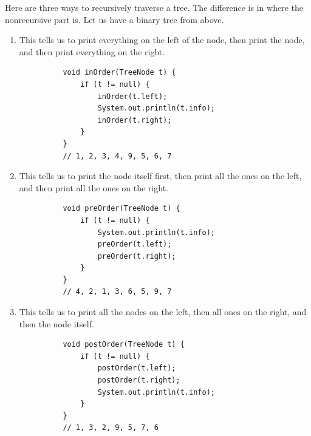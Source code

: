 \documentclass{article}
\begin{document}
      \begin{theorem}
      Here are three ways to recursively traverse a tree. The difference is in where the nonrecursive part is. Let us have a binary tree from above. 
      \begin{enumerate}
          \item This tells us to print everything on the left of the node, then print the node, and then print everything on the right. 
          \begin{lstlisting}
          void inOrder(TreeNode t) {
              if (t != null) {
                  inOrder(t.left);
                  System.out.println(t.info); 
                  inOrder(t.right); 
              }
          }
          // 1, 2, 3, 4, 9, 5, 6, 7
          \end{lstlisting}
          
          \item This tells us to print the node itself first, then print all the ones on the left, and then print all the ones on the right. 
          \begin{lstlisting}
          void preOrder(TreeNode t) {
              if (t != null) {
                  System.out.println(t.info); 
                  preOrder(t.left); 
                  preOrder(t.right); 
              }
          }
          // 4, 2, 1, 3, 6, 5, 9, 7
          \end{lstlisting}
          
          \item This tells us to print all the nodes on the left, then all ones on the right, and then the node itself. 
          \begin{lstlisting}
          void postOrder(TreeNode t) {
              if (t != null) {
                  postOrder(t.left); 
                  postOrder(t.right); 
                  System.out.println(t.info); 
              }
          }
          // 1, 3, 2, 9, 5, 7, 6
          \end{lstlisting}
      \end{enumerate}
      \end{theorem}
\end{document}
